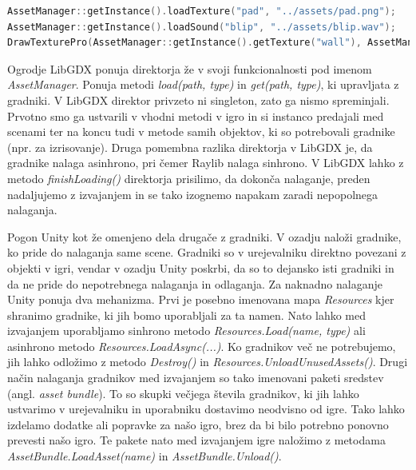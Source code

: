 \documentclass[12pt,a4paper,twoside]{book}
\begin{document}
\begin{lstlisting}[label=code:assetManager, language=C++, caption=Uporaba direktorja virov]
AssetManager::getInstance().loadTexture("pad", "../assets/pad.png");
AssetManager::getInstance().loadSound("blip", "../assets/blip.wav");
DrawTexturePro(AssetManager::getInstance().getTexture("wall"), AssetManager::getInstance().getRectangle("wall"), renderRectangle, Vector2{0, 0}, 0, BLUE);
\end{lstlisting}

Ogrodje LibGDX ponuja direktorja že v svoji funkcionalnosti pod imenom \textit{AssetManager}. Ponuja metodi \textit{load(path, type)} in \textit{get(path, type)}, ki upravljata z gradniki. V LibGDX direktor privzeto ni singleton, zato ga nismo spreminjali. Prvotno smo ga ustvarili v vhodni metodi v igro in si instanco predajali med scenami ter na koncu tudi v metode samih objektov, ki so potrebovali gradnike (npr. za izrisovanje). Druga pomembna razlika direktorja v LibGDX je, da gradnike nalaga asinhrono, pri čemer Raylib nalaga sinhrono. V LibGDX lahko z metodo \textit{finishLoading()} direktorja prisilimo, da dokonča nalaganje, preden nadaljujemo z izvajanjem in se tako izognemo napakam zaradi nepopolnega nalaganja.

Pogon Unity kot že omenjeno dela drugače z gradniki. V ozadju naloži gradnike, ko pride do nalaganja same scene. Gradniki so v urejevalniku direktno povezani z objekti v igri, vendar v ozadju Unity poskrbi, da so to dejansko isti gradniki in da ne pride do nepotrebnega nalaganja in odlaganja. Za naknadno nalaganje Unity ponuja dva mehanizma. Prvi je posebno imenovana mapa \textit{Resources} kjer shranimo gradnike, ki jih bomo uporabljali za ta namen. Nato lahko med izvajanjem uporabljamo sinhrono metodo \textit{Resources.Load(name, type)} ali asinhrono metodo \textit{Resources.LoadAsync(...)}. Ko gradnikov več ne potrebujemo, jih lahko odložimo z metodo \textit{Destroy()} in \textit{Resources.UnloadUnusedAssets()}. Drugi način nalaganja gradnikov med izvajanjem so tako imenovani paketi sredstev (angl. \textit{asset bundle}). To so skupki večjega števila gradnikov, ki jih lahko ustvarimo v urejevalniku in uporabniku dostavimo neodvisno od igre. Tako lahko izdelamo dodatke ali popravke za našo igro, brez da bi bilo potrebno ponovno prevesti našo igro. Te pakete nato med izvajanjem igre naložimo z metodama \textit{AssetBundle.LoadAsset(name)} in \textit{AssetBundle.Unload()}. 
\end{document}
